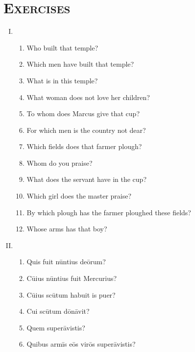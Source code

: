 \documentclass[12pt]{article}
\begin{document}
\section{\textsc{Exercises}}
\begin{enumerate}[I.]
	\setlength{\itemsep}{1em}
	\item \begin{enumerate}[1)]
		\item Who built that temple?
		\item Which men have built that temple?
		\item What is in this temple?
		\item What woman does not love her children?
		\item To whom does Marcus give that cup?
		\item For which men is the country not dear?
		\item Which fields does that farmer plough?
		\item Whom do you praise?
		\item What does the servant have in the cup?
		\item Which girl does the master praise?
		\item By which plough has the farmer ploughed these fields?
		\item Whose arms has that boy?
	\end{enumerate}
	\item \begin{enumerate}[1)]
		\item Quis fuit nūntius deōrum?
		\item Cūius nūntius fuit Mercurius?
		\item Cūius scūtum habuit is puer?
		\item Cui scūtum dōnāvit?
		\item Quem superāvistis?
		\item Quibus armīs eōs virōs superāvistis?
	\end{enumerate}
\end{enumerate}
\end{document}
